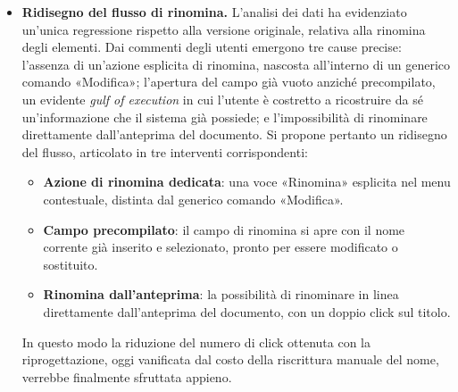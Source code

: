 \begin{itemize}
\begin{itemize}
    progettuale di non replicare nella Community le cartelle personali della
    sezione Appunti, si propone l'introduzione di un sistema di gestione
    documentale condiviso, che organizzi gli appunti della community in raccolte
    gerarchiche per corso di studi, insegnamento e argomento, affiancate da tag
    e metadati, mantenendo la ricerca e la navigazione efficienti anche al
    crescere dei contenuti.
  \end{itemize}
  I due interventi agiscono sui due estremi del ciclo di vita del documento --
  il caricamento e la consultazione -- riducendo la rigidità segnalata dagli
  utenti e garantendo la scalabilità organizzativa della piattaforma nel lungo
  periodo.

  \item \textbf{Ridisegno del flusso di rinomina.} L'analisi dei dati ha
  evidenziato un'unica regressione rispetto alla versione originale, relativa
  alla rinomina degli elementi. Dai commenti degli utenti emergono tre cause
  precise: l'assenza di un'azione esplicita di rinomina, nascosta all'interno di
  un generico comando «Modifica»; l'apertura del campo già vuoto anziché
  precompilato, un evidente \textit{gulf of execution} in cui l'utente è
  costretto a ricostruire da sé un'informazione che il sistema già possiede; e
  l'impossibilità di rinominare direttamente dall'anteprima del documento. Si
  propone pertanto un ridisegno del flusso, articolato in tre interventi
  corrispondenti:
  \begin{itemize}
    \item \textbf{Azione di rinomina dedicata}: una voce «Rinomina» esplicita nel
    menu contestuale, distinta dal generico comando «Modifica».
    \item \textbf{Campo precompilato}: il campo di rinomina si apre con il nome
    corrente già inserito e selezionato, pronto per essere modificato o
    sostituito.
    \item \textbf{Rinomina dall'anteprima}: la possibilità di rinominare in linea
    direttamente dall'anteprima del documento, con un doppio click sul titolo.
  \end{itemize}
  In questo modo la riduzione del numero di click ottenuta con la
  riprogettazione, oggi vanificata dal costo della riscrittura manuale del nome,
  verrebbe finalmente sfruttata appieno.


\end{itemize}
